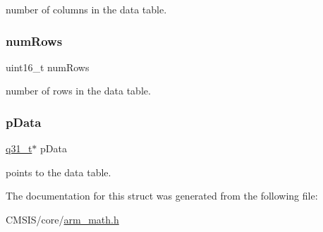 number of columns in the data table. \mbox{\label{structarm__bilinear__interp__instance__q31_a1bcf80ccdc2acc29198f1592ae300390}} 
\subsubsection{\texorpdfstring{numRows}{numRows}}
{\footnotesize\ttfamily uint16\+\_\+t num\+Rows}

number of rows in the data table. \mbox{\label{structarm__bilinear__interp__instance__q31_ad296f76577326ff280726323536eed6d}} 
\subsubsection{\texorpdfstring{pData}{pData}}
{\footnotesize\ttfamily \mbox{\hyperlink{arm__math_8h_adc89a3547f5324b7b3b95adec3806bc0}{q31\+\_\+t}}$\ast$ p\+Data}

points to the data table. 

The documentation for this struct was generated from the following file\+:\begin{DoxyCompactItemize}
\item 
C\+M\+S\+I\+S/core/\mbox{\hyperlink{arm__math_8h}{arm\+\_\+math.\+h}}\end{DoxyCompactItemize}
